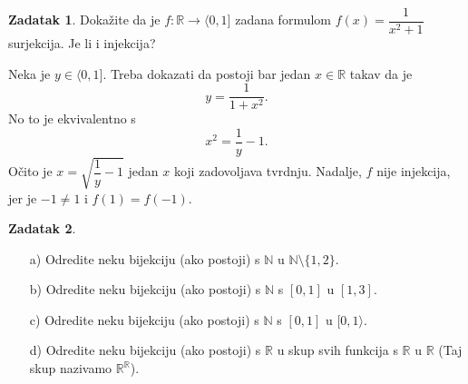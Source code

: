 \documentclass{book}
\renewenvironment{proof}{%
    \vspace{-\parskip}\begin{oldproof}%
    }{%
    \end{oldproof}%
}
\theoremstyle{definition}
\theoremstyle{definition}
\newtheorem{exercise}{Zadatak}
\theoremstyle{remark}
\begin{document}
\begin{exercise}
Dokažite da je $f : \mathbb{R}\to \langle 0, 1]$ zadana formulom $f(x)=\dfrac{1}{x^2+1}$ surjekcija. Je li i injekcija?
\end{exercise}
\begin{proof}[Rješenje]
Neka je $y\in \langle 0, 1]$. Treba dokazati da postoji bar jedan $x\in \mathbb{R}$ takav da je $$y=\dfrac{1}{1+x^2}.$$ No to je ekvivalentno s $$x^2=\dfrac{1}{y}-1.$$ 
Očito je $x=\sqrt{\dfrac{1}{y}-1}$ jedan $x$ koji zadovoljava tvrdnju. Nadalje, $f$ nije injekcija, jer je $-1\neq 1$ i $f(1)=f(-1)$.
\end{proof}
\begin{exercise} \textbf{}
\label{bijexmp}
\begin{itemize}
\item[a)] Odredite neku bijekciju (ako postoji) s $\mathbb{N}$ u $\mathbb{N}\setminus\{1, 2\}$.
\item[b)] Odredite neku bijekciju (ako postoji) s $\mathbb{N}$ s $[0, 1]$ u $[1, 3]$.
\item[c)] Odredite neku bijekciju (ako postoji) s $\mathbb{N}$ s $[0, 1]$ u $[0, 1\rangle$.
\item[d)] Odredite neku bijekciju (ako postoji) s $\mathbb{R}$ u skup svih funkcija s $\mathbb{R}$ u $\mathbb{R}$ (Taj skup nazivamo $\mathbb{R}^\mathbb{R}$).
\end{itemize}
\end{exercise}
\end{document}
